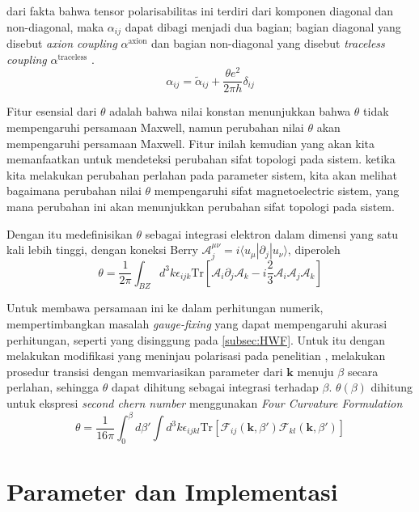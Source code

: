 dari fakta bahwa tensor polarisabilitas ini terdiri dari komponen diagonal dan non-diagonal, maka $\alpha_{ij}$ dapat dibagi menjadi dua bagian; bagian diagonal yang disebut \textit{axion coupling} $\alpha^{\text{axion}}$ dan bagian non-diagonal yang disebut \textit{traceless coupling} $\alpha^{\text{traceless}}$ \parencite{PhysRevLett.102.146805}.
\[
\alpha_{ij} = \tilde{\alpha}_{ij} + \frac{\theta e^2}{2 \pi h}\delta_{ij}
\]
\par
Fitur esensial dari $\theta$ adalah bahwa nilai konstan menunjukkan bahwa $\theta$ tidak mempengaruhi persamaan Maxwell, namun perubahan nilai $\theta$ akan mempengaruhi persamaan Maxwell. Fitur inilah kemudian yang akan kita memanfaatkan untuk mendeteksi perubahan sifat topologi pada sistem. ketika kita melakukan perubahan perlahan pada parameter sistem, kita akan melihat bagaimana perubahan nilai $\theta$ mempengaruhi sifat magnetoelectric sistem, yang mana perubahan ini akan menunjukkan perubahan sifat topologi pada sistem.
\par
Dengan itu \parencite{PhysRevB.78.195424} medefinisikan $\theta$ sebagai integrasi elektron dalam dimensi yang satu kali lebih tinggi, dengan koneksi Berry $\mathcal{A}^{\mu\nu}_j = i \langle u_{\mu} | \partial_j | u_{\nu} \rangle$, diperoleh
\[
  \theta = \frac{1}{2\pi} \int_{BZ} d^3 k \epsilon_{ijk} \text{Tr}[\mathcal{A}_i \partial_j \mathcal{A}_k - i \frac{2}{3}\mathcal{A}_i\mathcal{A}_j\mathcal{A}_k]
\]

Untuk membawa persamaan ini ke dalam perhitungan numerik, \parencite{PhysRevLett.102.146805} mempertimbangkan masalah \textit{gauge-fixing} yang dapat mempengaruhi akurasi perhitungan, seperti yang disinggung pada \ref{subsec:HWF}. Untuk itu dengan melakukan modifikasi yang meninjau polarisasi pada penelitian \parencite{Vanderbilt2018}, \parencite{PhysRevLett.102.146805} melakukan prosedur transisi dengan memvariasikan parameter dari $\mathbf{k}$ menuju $\beta$ secara perlahan, sehingga $\theta$ dapat dihitung sebagai integrasi terhadap $\beta$. $\theta(\beta)$ dihitung untuk ekspresi \textit{second chern number} menggunakan \textit{Four Curvature Formulation}
\[
  \theta = \frac{1}{16\pi} \int_{0}^{\beta} d\beta' \int d^3k \epsilon_{ijkl} \text{Tr}[\mathcal{F}_{ij}(\mathbf{k}, \beta')\mathcal{F}_{kl}(\mathbf{k}, \beta')]

\]

\section{Parameter dan Implementasi}
